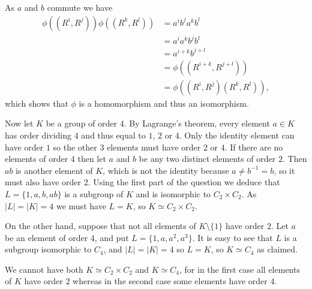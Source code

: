 \documentclass{amsart}
\renewcommand{\:}{\colon}
\newcommand{\sm}{\setminus}
\newcommand{\tm}{\times}
\theoremstyle{definition}
\newenvironment{solution}{{\noindent\bf Solution:}}{}
\begin{document}
\begin{solution}
 As $a$ and $b$ commute we have
 \begin{align*}
  \phi((R^i,R^j))\phi((R^k,R^l)) &=
   a^ib^ja^kb^l \\
   &= a^ia^kb^jb^l \\
   &= a^{i+k} b^{j+l} \\
   &= \phi((R^{i+k},R^{j+l})) \\
   &= \phi((R^i,R^j)(R^k,R^l)),
 \end{align*}
 which shows that $\phi$ is a homomorphism and thus an isomorphism.

 Now let $K$ be a group of order $4$.  By Lagrange's theorem, every
 element $a\in K$ has order dividing $4$ and thus equal to $1$, $2$ or
 $4$.  Only the identity element can have order $1$ so the other $3$
 elements must have order $2$ or $4$.  If there are no elements of
 order $4$ then let $a$ and $b$ be any two distinct elements of order
 $2$.  Then $ab$ is another element of $K$, which is not the identity
 because $a\neq b^{-1}=b$, so it must also have order $2$.  Using the
 first part of the question we deduce that $L=\{1,a,b,ab\}$ is a
 subgroup of $K$ and is isomorphic to $C_2\tm C_2$.  As $|L|=|K|=4$ we
 must have $L=K$, so $K\simeq C_2\tm C_2$.

 On the other hand, suppose that not all elements of $K\sm\{1\}$ have
 order $2$.  Let $a$ be an element of order $4$, and put
 $L=\{1,a,a^2,a^3\}$.  It is easy to see that $L$ is a subgroup
 isomorphic to $C_4$, and $|L|=|K|=4$ so $L=K$, so $K\simeq C_4$ as
 claimed.  

 We cannot have both $K\simeq C_2\tm C_2$ and $K\simeq C_4$, for in
 the first case all elements of $K$ have order $2$ whereas in the
 second case some elements have order $4$.
\end{solution}
\end{document}
